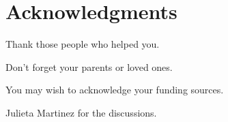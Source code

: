 
\chapter{Acknowledgments}

Thank those people who helped you. 

Don't forget your parents or loved ones.

You may wish to acknowledge your funding sources.


Julieta Martinez for the discussions.
